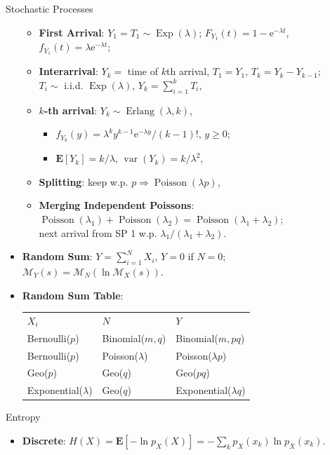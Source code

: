 \documentclass[landscape,a4paper]{article}
\newcommand{\e}{\mathrm{e}}
\newcommand{\EE}{\mathbf{E}}
\newcommand{\var}{\operatorname{var}}
\begin{document}
\begin{multicols*}{4}
\begin{card}{Stochastic Processes}
\begin{itemize}
\begin{itemize}
					\item \textbf{First Arrival}: $Y_1=T_1\sim\operatorname{Exp}(\lambda)$; $F_{Y_1}(t)=1-\e^{-\lambda t}$, $f_{Y_1}(t)=\lambda\e^{-\lambda t}$; 
					\item \textbf{Interarrival}: $Y_k=$ time of $k$th arrival, $T_1=Y_1$, $T_k=Y_k-Y_{k-1}$;\\$T_i\sim$ i.i.d. $\operatorname{Exp}(\lambda)$, $Y_k=\sum_{i=1}^kT_i$,
					\item \textbf{$k$-th arrival}: $Y_k\sim \operatorname{Erlang}(\lambda, k)$,
					\begin{itemize}
						\item $f_{Y_k}(y)=\lambda^ky^{k-1}\e^{-\lambda y}/(k-1)!$, $y\ge0$;
						\item $\EE[Y_k]=k/\lambda$, $\var(Y_k)=k/\lambda^2$,
					\end{itemize}
					\item \textbf{Splitting}: keep w.p. $p\Rightarrow\operatorname{Poisson}(\lambda p)$,
					\item \textbf{Merging Independent Poissons}: $\operatorname{Poisson}(\lambda_1)+\operatorname{Poisson}(\lambda_2)=\operatorname{Poisson}(\lambda_1+\lambda_2)$;\\next arrival from SP 1 w.p. $\lambda_1/(\lambda_1+\lambda_2)$.
				\end{itemize}
				\item \textbf{Random Sum}: $Y=\sum_{i=1}^NX_i$, $Y=0$ if $N=0$; $\mathscr{M}_Y(s)=\mathscr{M}_N(\ln\mathscr{M}_X(s))$.
				\item \textbf{Random Sum Table}:
				\begin{center}
					\begin{tabular}{@{}lll@{}}
						$X_i$ & $N$ & $Y$\\
						Bernoulli($p$) & Binomial($m,q$) & Binomial($m,pq$)\\
						Bernoulli($p$) & Poisson($\lambda$) & Poisson($\lambda p$)\\
						Geo($p$) & Geo($q$) & Geo($pq$)\\
						Exponential($\lambda$) & Geo($q$) & Exponential($\lambda q$)
					\end{tabular}
				\end{center}
			\end{itemize}
		\end{card}
		\begin{card}{Entropy}
			\begin{itemize}
				\item \textbf{Discrete}: $H(X)=\EE[-\ln p_X(X)]=-\sum_k p_X(x_k)\ln p_X(x_k)$.

\end{itemize}
\end{card}
\end{multicols*}
\end{document}
